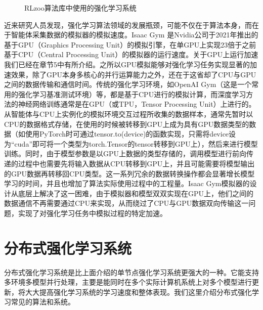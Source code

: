 \documentclass[letterpaper,10pt,english]{sphinxmanual}
\let\sphinxpxdimen\pdfpxdimen\else\newdimen\sphinxpxdimen
\begin{document}
\begin{figure}[H]
\centering
\capstart

\noindent\sphinxincludegraphics[width=800\sphinxpxdimen]{{ch12-rlzoo}.png}
\caption{RLzoo算法库中使用的强化学习系统}\label{\detokenize{chapter_reinforcement_learning/single_node_rl:id4}}\label{\detokenize{chapter_reinforcement_learning/single_node_rl:ch12-ch12-rlzoo}}\end{figure}

\sphinxAtStartPar
近来研究人员发现，强化学习算法领域的发展瓶颈，可能不仅在于算法本身，而在于智能体采集数据的模拟器的模拟速度。Isaac
Gym
是Nvidia公司于2021年推出的基于GPU（Graphics
Processing Unit）的模拟引擎，在单GPU上实现2\sphinxhyphen{}3倍于之前基于CPU（Central
Processing
Unit）的模拟器的运行速度。关于GPU上运行加速我们已经在章节5中有所介绍。之所以GPU模拟能够对强化学习任务实现显著的加速效果，除了GPU本身多核心的并行运算能力之外，还在于这省却了CPU与GPU之间的数据传输和通信时间。传统的强化学习环境，如OpenAI
Gym（这是一个常用的强化学习基准测试环境）等，都是基于CPU进行的模拟计算，而深度学习方法的神经网络训练通常是在GPU（或TPU，Tensor
Processing
Unit）上进行的。从智能体与CPU上实例化的模拟环境交互过程所收集的数据样本，通常先暂时以CPU的数据格式存储，在使用的时候被转移到GPU上成为具有GPU数据类型的数据（如使用PyTorch时可通过tensor.to(device)的函数实现，只需将device设为“cuda”即可将一个类型为torch.Tensor的tensor转移到GPU上），然后来进行模型训练。同时，由于模型参数是以GPU上数据的类型存储的，调用模型进行前向传递的过程中也需要先将输入数据从CPU转移到GPU上，并且可能需要将模型输出的GPU数据再转移回CPU类型。这一系列冗余的数据转换操作都会显著增长模型学习的时间，并且也增加了算法实际使用过程中的工程量。Isaac
Gym模拟器的设计从底层上解决了这一困难，由于模拟器和模型双双实现在GPU上，他们之间的数据通信不再需要通过CPU来实现，从而绕过了CPU与GPU数据双向传输这一问题，实现了对强化学习任务中模拟过程的特定加速。


\section{分布式强化学习系统}
\label{\detokenize{chapter_reinforcement_learning/distributed_node_rl:id1}}\label{\detokenize{chapter_reinforcement_learning/distributed_node_rl::doc}}
\sphinxAtStartPar
分布式强化学习系统是比上面介绍的单节点强化学习系统更强大的一种。它能支持多环境多模型并行处理，主要是能同时在多个实际计算机系统上对多个模型进行更新，将大大提高强化学习系统的学习速度和整体表现。我们这里介绍分布式强化学习常见的算法和系统。
\end{document}
